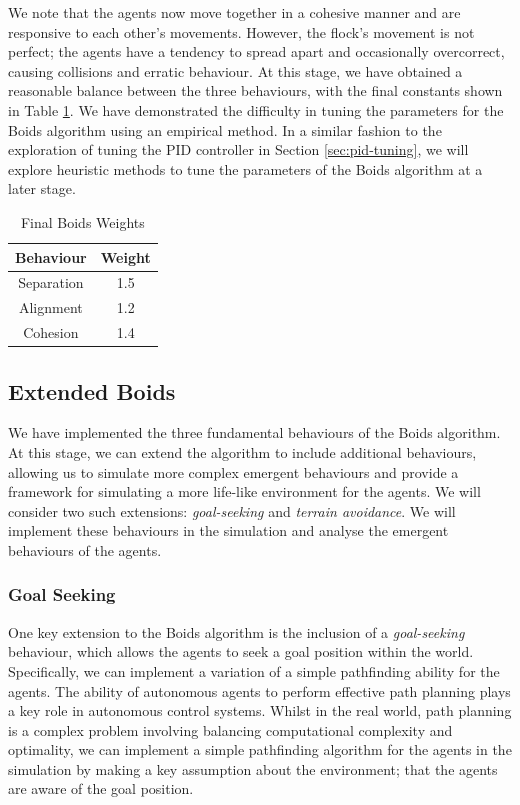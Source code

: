 \documentclass[12pt]{article}
\begin{document}
We note that the agents now move together in a cohesive manner and are responsive to each other's movements. However, the flock's movement is not perfect; the agents have a tendency to spread apart and occasionally overcorrect, causing collisions and erratic behaviour. At this stage, we have obtained a reasonable balance between the three behaviours, with the final constants shown in Table \ref{tab:boids-weights-final}. We have demonstrated the difficulty in tuning the parameters for the Boids algorithm using an empirical method. In a similar fashion to the exploration of tuning the PID controller in Section \ref{sec:pid-tuning}, we will explore heuristic methods to tune the parameters of the Boids algorithm at a later stage.

\begin{table}[ht]
    \centering
    \begin{tabular}{| c | c |} 
    \hline
    Behaviour & Weight \\ 
    \hline\hline
    Separation & 1.5 \\
    \hline
    Alignment & 1.2 \\
    \hline
    Cohesion & 1.4 \\
    \hline
    \end{tabular}
    \caption{Final Boids Weights}
    \label{tab:boids-weights-final}
\end{table}

\subsection{Extended Boids}
We have implemented the three fundamental behaviours of the Boids algorithm. At this stage, we can extend the algorithm to include additional behaviours, allowing us to simulate more complex emergent behaviours and provide a framework for simulating a more life-like environment for the agents. We will consider two such extensions: \emph{goal-seeking} and \emph{terrain avoidance}. We will implement these behaviours in the simulation and analyse the emergent behaviours of the agents.

\subsubsection{Goal Seeking}
\label{sec:goal-seek}
One key extension to the Boids algorithm is the inclusion of a \emph{goal-seeking} behaviour, which allows the agents to seek a goal position within the world. Specifically, we can implement a variation of a simple pathfinding ability for the agents. The ability of autonomous agents to perform effective path planning plays a key role in autonomous control systems\cite{liu2020autonomous}. Whilst in the real world, path planning is a complex problem involving balancing computational complexity and optimality, we can implement a simple pathfinding algorithm for the agents in the simulation by making a key assumption about the environment; that the agents are aware of the goal position.
\end{document}
